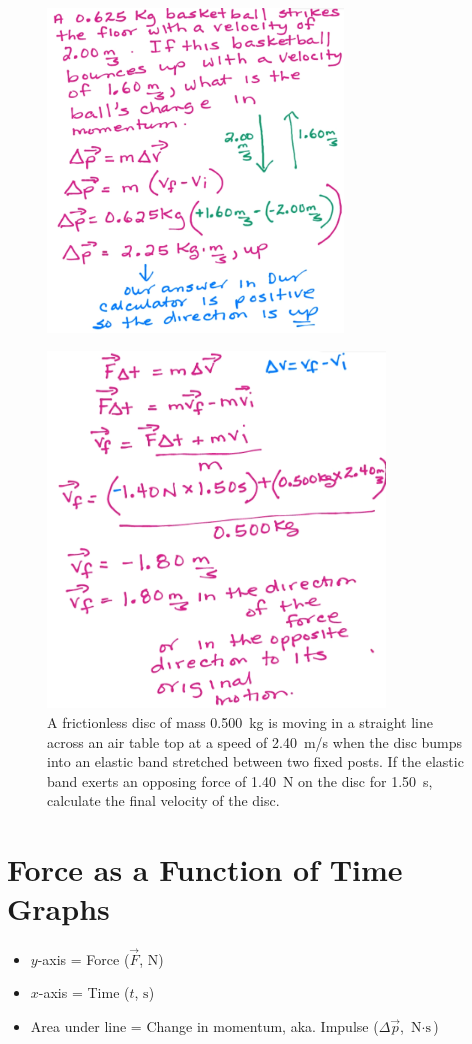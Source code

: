 \documentclass[a4paper,12pt]{article}
\begin{document}
\begin{figure}[H]
    \centering
    \includegraphics[width=0.7\textwidth]{q-imp}
\end{figure}
\begin{figure}[H]
    \centering
    \caption{A frictionless disc of mass \SI{0.500}{\kg} is moving in a straight line across an air table top at a speed of \SI{2.40}{\m/\s} when the disc bumps into an elastic band stretched between two fixed posts. If the elastic band exerts an opposing force of \SI{1.40}{\N} on the disc for \SI{1.50}{\s}, calculate the final velocity of the disc.}
    \includegraphics[width=0.8\textwidth]{q-imp-2}
\end{figure}

\pagebreak

\section{Force as a Function of Time Graphs}
\begin{itemize}
    \item{$y$-axis = Force ($\vec{F}$, $\si{\N}$)}
    \item{$x$-axis = Time ($t$, $\si{\s}$)}
    \item{Area under line = Change in momentum, aka. Impulse ($\Delta{\vec{p}}$, $\si{\N\cdot\s}$)}
\end{itemize}
\end{document}
